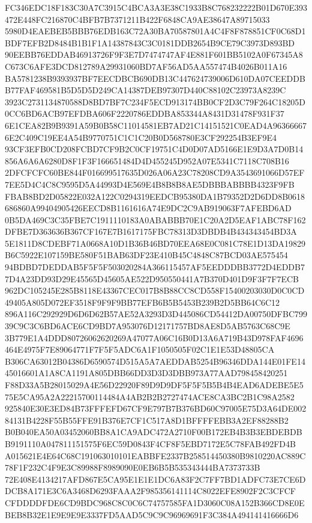 \documentclass[UTF8,fontset=fandol,zihao=-4,a4paper]{ctexart}
\begin{document}
{{FC346EDC18F183C30A7C3915C4BCA3A3E38C1933B8C768232222B01D670E393472E448FC216870C4BFB7B7371211B422F6848CA9AE38647A89715033
5980D4EAEBEB5BBB76EDB163C72A30BA70587801A4C4F8F878851CF0C68D1BDF7EFB2D8484B1B1F1A14387843C3C0181DDB2654B9CE79C3973D893BD
90EEBB76EDDAB46913726F9F3E7D7474747AF4E881F601BB5102A0F67345A8C673C6AFE3DCD812789A29931060BD7AF56AD5AA557474B4026B011A16
BA5781238B9393937BF7EECDBCB690DB13C447624739006D610DA07CEEDDBB77FAF469581B5D5D5D249CA14387DEB97307D440C88102C23973A8239C
3923C2731134870588D8BD7BF7C234F5ECD913174BB0CF2D3C79F264C18205D0CC6BD6ACB97EFDBA606F2220786EDDBA853344A8431D31478F931F37
6E1CEA82B9B9391A59B0B58C11014581EB7AD21C14151521C0EAD4A963666676E2C409C19EE4A54B9770751C1C1C20B0D568780E3CF292254B3EF9E4
93CF3EFB0CD208FCBD7CF9B2C0CF19751C4D0D07AD5166E1E9D3A7D0B14856A6A6A6280D8F1F3F166651484D4D455245D952A07E5341C7118C708B16
2DFCFCFC60BE844F016699517635D026A06A23C78208CD9A3543691066D57EF7EE5D4C4C8C9595D5A44993D4E569E4B8B8B8AE5DBBBABBBB4323F9FB
FBAB8BD2D05822E032A122C0294319EEDCB95380DA1B79352D2D6DD8B0618686860A99404905426EECD8B1161616A74E9DC2C9AB919063F7AFEBD6AD
0B5DA469C3C35FBE7C1911110183A0ABABBB70E1C20A2D5EAF1ABC78F162DFBE7D363636B367CF167E7B1617175FBC78313D3DBDB4B434343454BD3A
5E1811D8CDEBF71A0668A10D1B36B46BD70EEA68E0C081C78E1D13DA19829B6C5922E107159BE580F51BAB63DF23E410B45C4848C87BCD03AE575454
94BDBD7DEDDAB5F5F5F503020284A366115457AF5EEDDDBB3772D4EDDB77D4A23DD93D29E45565D45605AE522D950550441A7B370D401D9F3F7F7ECB
962DC105245E285B8118E43367CEC017B8B88CC8CD558F15400203030D0C0CD49405A805D072EF3518F9F9F9BB77EFB6B5B5453B239B2D5BB64C6C12
896A116C292929D6D6D62B57AE52A3293D3D445086CD54412DA00750DFBC79939C9C3C6BD6ACE6CD9BD7A953076D12171757BD8AE8D5AB5763C68C9E
3B779E1A4DDD80726062620269A47077A06C16B0D13A6A719B43D978FAF4696464E4975F7E89064771F7F5F5ADC6A1F1050505F02C1E1E53D48805CA
B306CA63012B04386D6590574D515A5A7AEDDAB5254B96346DDA144E01FE1445016601A1A8CA1191A805DBB66DD3D3D3DBB973A77AAD798458420251
F88D33A5B28015029A4E56D22920F89D9D9DF5F5F5B5B4B4EAD6ADEBE5E575E5CA95A2A22215700114484A4AB2B2B2727474ACE8CA3BC2B1C98A2582
925840E30E3ED84B73FFFEFD67CF9E797B7B376BD60C97005E75D3A64DE00284131B4228F55B55FFE91B376E7CF1C517A8D1BFFFFEBB3A2EF88288B2
B0B040EA50A03452060BB8A1CA9ADC472A2710F00B172EB4B3B3EBDEBDBB9191110A047811151575F6EC59D0843F4CF8F5EBD7172E5C78FAB492FD4B
A015621E4E64C68C191063010101EABBFE2337B258514450380B9810220AC889C78F1F232C4F9E3C89988F8989090E0EB6B5B535343444BA7373733B
72E408E4134217AFD867E5CA95E1E1E1DC6A83F2C7FF7BD1ADFC73E7CE6DDCB8A171E3C6A3468D6293FAAA2F985356141114C8022EFE8902F2C3CFCF
CFDDDDFDE6CD9BDC968C8C0C6C74757585FA1D3060C08A152B366CD8E0EBEB8B32E1E9E9E9E3337FD5AAD5C9C9C96969691F3C384A494141416666D6
}}
\end{document}
